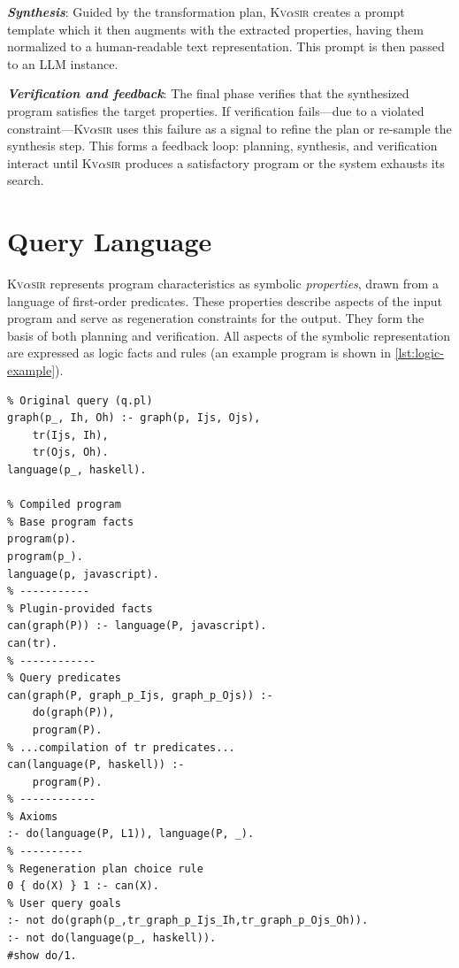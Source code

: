 \documentclass[nonacm,sigplan]{acmart}
\def\eg{{\em e.g.}, }
\newcommand{\sys}{{\scshape Kv{$\alpha$}sir}\xspace}
\newcommand{\heading}[1]{\vspace{2pt}\noindent\textbf{\emph{#1}}:\enspace}
\newcommand{\ttt}[1]{\texttt{#1}\xspace}
\begin{document}
\heading{Synthesis}
Guided by the transformation plan, \sys creates a prompt template which it then
augments with the extracted properties, having them normalized to a human-readable text representation.
This prompt is then passed to an LLM instance.

\heading{Verification and feedback}
The final phase verifies that the
synthesized program satisfies the target properties.
If verification fails---due to a violated constraint---\sys uses this
failure as a signal to refine the plan or re-sample the synthesis step.
This forms a feedback loop: planning, synthesis, and verification interact until \sys
produces a satisfactory program or the system exhausts its search.

\section{Query Language}
\label{sec:dsl}

\sys represents program characteristics as symbolic \emph{properties}, drawn from a language of first-order predicates.
These properties describe aspects of the input program and serve as regeneration constraints for the output.
They form the basis of both planning and verification.
All aspects of the symbolic representation are expressed as logic facts and rules (an example program is shown in \cref{lst:logic-example}).

\begin{listing}[t]
  \begin{verbatim}
% Original query (q.pl)
graph(p_, Ih, Oh) :- graph(p, Ijs, Ojs),
    tr(Ijs, Ih),
    tr(Ojs, Oh).
language(p_, haskell).

% Compiled program
% Base program facts
program(p).
program(p_).
language(p, javascript).
% -----------
% Plugin-provided facts
can(graph(P)) :- language(P, javascript).
can(tr).
% ------------
% Query predicates
can(graph(P, graph_p_Ijs, graph_p_Ojs)) :-
    do(graph(P)),
    program(P).
% ...compilation of tr predicates...
can(language(P, haskell)) :-
    program(P).
% ------------
% Axioms
:- do(language(P, L1)), language(P, _). 
% ----------
% Regeneration plan choice rule
0 { do(X) } 1 :- can(X).
% User query goals
:- not do(graph(p_,tr_graph_p_Ijs_Ih,tr_graph_p_Ojs_Oh)).
:- not do(language(p_, haskell)).
#show do/1.
\end{verbatim}
  \caption{\textbf{Compiled \sys logic program.}
  The logic program that produces the plan for the idiomatization task in \cref{sec:example}. 
  The program contains facts coming from 
  (1) the input program (written in C),
  (2) three plugins (\ttt{len}, \ttt{fsignt}, and \ttt{tr}),
  (3) axioms from the logic engine (\eg a program can have one language, an analysis will be applied only if possible, all goals must be satisfied), and
  (4) the user query (the user wants to minimize the program's length).
  }
  \label{lst:logic-example}
\end{listing}
\end{document}
